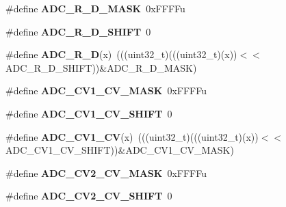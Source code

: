 \begin{DoxyCompactItemize}
\item 
\#define {\bfseries A\+D\+C\+\_\+\+R\+\_\+\+D\+\_\+\+M\+A\+SK}~0x\+F\+F\+F\+Fu\hypertarget{group__ADC__Register__Masks_ga7dadc81f58826b303fb83918820cd177}{}\label{group__ADC__Register__Masks_ga7dadc81f58826b303fb83918820cd177}

\item 
\#define {\bfseries A\+D\+C\+\_\+\+R\+\_\+\+D\+\_\+\+S\+H\+I\+FT}~0\hypertarget{group__ADC__Register__Masks_ga8e2365e522772584a5ee2dd6a8b0987a}{}\label{group__ADC__Register__Masks_ga8e2365e522772584a5ee2dd6a8b0987a}

\item 
\#define {\bfseries A\+D\+C\+\_\+\+R\+\_\+D}(x)~(((uint32\+\_\+t)(((uint32\+\_\+t)(x))$<$$<$A\+D\+C\+\_\+\+R\+\_\+\+D\+\_\+\+S\+H\+I\+FT))\&A\+D\+C\+\_\+\+R\+\_\+\+D\+\_\+\+M\+A\+SK)\hypertarget{group__ADC__Register__Masks_ga170d774b5b873c5b8355cd8a57810f32}{}\label{group__ADC__Register__Masks_ga170d774b5b873c5b8355cd8a57810f32}

\item 
\#define {\bfseries A\+D\+C\+\_\+\+C\+V1\+\_\+\+C\+V\+\_\+\+M\+A\+SK}~0x\+F\+F\+F\+Fu\hypertarget{group__ADC__Register__Masks_gad67c3b5f385cd9b26be8257134e1e3cf}{}\label{group__ADC__Register__Masks_gad67c3b5f385cd9b26be8257134e1e3cf}

\item 
\#define {\bfseries A\+D\+C\+\_\+\+C\+V1\+\_\+\+C\+V\+\_\+\+S\+H\+I\+FT}~0\hypertarget{group__ADC__Register__Masks_ga1925520ab1dd2eb81e0e4505af905c13}{}\label{group__ADC__Register__Masks_ga1925520ab1dd2eb81e0e4505af905c13}

\item 
\#define {\bfseries A\+D\+C\+\_\+\+C\+V1\+\_\+\+CV}(x)~(((uint32\+\_\+t)(((uint32\+\_\+t)(x))$<$$<$A\+D\+C\+\_\+\+C\+V1\+\_\+\+C\+V\+\_\+\+S\+H\+I\+FT))\&A\+D\+C\+\_\+\+C\+V1\+\_\+\+C\+V\+\_\+\+M\+A\+SK)\hypertarget{group__ADC__Register__Masks_ga941b887791f6ce780cb100ff3ef98407}{}\label{group__ADC__Register__Masks_ga941b887791f6ce780cb100ff3ef98407}

\item 
\#define {\bfseries A\+D\+C\+\_\+\+C\+V2\+\_\+\+C\+V\+\_\+\+M\+A\+SK}~0x\+F\+F\+F\+Fu\hypertarget{group__ADC__Register__Masks_gab61d022e3c8d84d77f2895a91c049023}{}\label{group__ADC__Register__Masks_gab61d022e3c8d84d77f2895a91c049023}

\item 
\#define {\bfseries A\+D\+C\+\_\+\+C\+V2\+\_\+\+C\+V\+\_\+\+S\+H\+I\+FT}~0\hypertarget{group__ADC__Register__Masks_ga5ecccc775bd06291531df6e989024d38}{}\label{group__ADC__Register__Masks_ga5ecccc775bd06291531df6e989024d38}


\end{DoxyCompactItemize}
